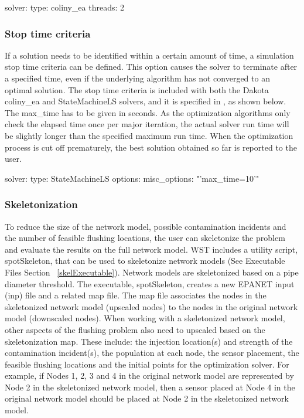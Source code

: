 \begin{unknownListing}
solver:
  type: coliny_ea 
  threads: 2
\end{unknownListing}

\subsubsection{Stop time criteria}

If a solution needs to be identified within a certain amount of time, a simulation stop time 
criteria can be defined. This option causes the solver to terminate after a 
specified time, even if the underlying algorithm has not converged to an optimal solution.  
The stop time criteria is included with both the Dakota coliny\_ea and 
StateMachineLS solvers, and it is specified in , as 
shown below. The max\_time has to be given in seconds. As the optimization 
algorithms only check the elapsed time once per major iteration, the actual 
solver run time will be slightly longer than the specified maximum run time.  
When the optimization process is cut off prematurely, the best solution 
obtained so far is reported to the user.

\begin{unknownListing}
solver:
  type: StateMachineLS  
  options: 
    misc_options: "'max_time=10'"
\end{unknownListing}

\subsubsection{Skeletonization}

To reduce the size of the network model, possible contamination incidents and the number of 
feasible flushing locations, the user can skeletonize the problem and evaluate 
the results on the full network model. WST includes a utility script, spotSkeleton,  
that can be used to skeletonize network models (See Executable Files Section ~\ref{skelExecutable}).  
Network models are skeletonized based on a pipe diameter threshold. The executable, spotSkeleton,  
creates a new EPANET input (inp) file and a related map file.  
The map file associates the nodes in the skeletonized network model (upscaled nodes)  
to the nodes in the original network model (downscaled nodes). When  
working with a skeletonized network model, other aspects of the flushing problem also  
need to upscaled based on the skeletonization map. These include: the injection location(s)  
and strength of the contamination incident(s), the population at each node, the sensor  
placement, the feasible flushing locations and the initial points for the optimization  
solver. For example, if Nodes 1, 2, 3 and 4 in the original network model are  
represented by Node 2 in the skeletonized network model, then a sensor placed at  
Node 4 in the original network model should be placed at Node 2 in the skeletonized  
network model. 

